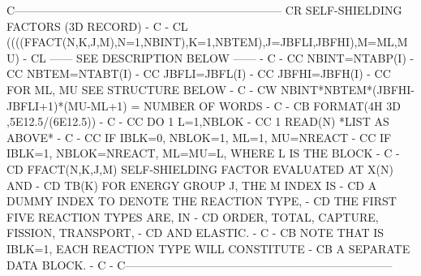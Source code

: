 \begin{ccode}
C-----------------------------------------------------------------------
CR          SELF-SHIELDING FACTORS   (3D RECORD)                       -
C                                                                      -
CL    ((((FFACT(N,K,J,M),N=1,NBINT),K=1,NBTEM),J=JBFLI,JBFHI),M=ML,MU) -
CL                  ------ SEE DESCRIPTION BELOW ------                -
C                                                                      -
CC    NBINT=NTABP(I)                                                   -
CC    NBTEM=NTABT(I)                                                   -
CC    JBFLI=JBFL(I)                                                    -
CC    JBFHI=JBFH(I)                                                    -
CC    FOR ML, MU SEE STRUCTURE BELOW                                   -
C                                                                      -
CW    NBINT*NBTEM*(JBFHI-JBFLI+1)*(MU-ML+1) = NUMBER OF WORDS          -
C                                                                      -
CB    FORMAT(4H 3D ,5E12.5/(6E12.5))                                   -
C                                                                      -
CC    DO 1 L=1,NBLOK                                                   -
CC  1 READ(N) *LIST AS ABOVE*                                          -
C                                                                      -
CC          IF IBLK=0, NBLOK=1, ML=1, MU=NREACT                        -
CC          IF IBLK=1, NBLOK=NREACT, ML=MU=L, WHERE L IS THE BLOCK     -
C                                                                      -
CD    FFACT(N,K,J,M)    SELF-SHIELDING FACTOR EVALUATED AT X(N) AND    -
CD                         TB(K) FOR ENERGY GROUP J, THE M INDEX IS    -
CD                         A DUMMY INDEX TO DENOTE THE REACTION TYPE,  -
CD                         THE FIRST FIVE REACTION TYPES ARE, IN       -
CD                         ORDER, TOTAL, CAPTURE, FISSION, TRANSPORT,  -
CD                         AND ELASTIC.                                -
C                                                                      -
CB          NOTE THAT IS IBLK=1, EACH REACTION TYPE WILL CONSTITUTE    -
CB             A SEPARATE DATA BLOCK.                                  -
C                                                                      -
C-----------------------------------------------------------------------


\end{ccode}
